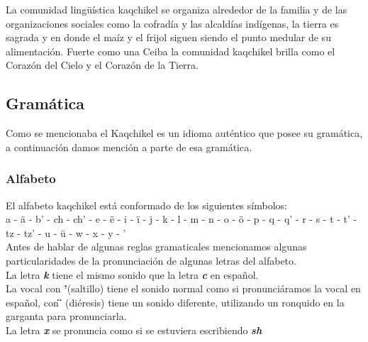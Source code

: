 \documentclass[a4paper,openright,11pt]{article}
\begin{document}
La comunidad lingüística kaqchikel se organiza alrededor de la familia y de las organizaciones sociales como la cofradía y las alcaldías indígenas, la tierra es sagrada y en donde el maíz y el frijol siguen siendo el punto medular de su alimentación. Fuerte como una Ceiba la comunidad kaqchikel brilla como el Corazón del Cielo y el Corazón de la Tierra.\\ 

\newpage
\subsection{Gramática}
Como se mencionaba el Kaqchikel es un idioma auténtico que posee su gramática, a continuación damos mención a parte de esa gramática.\\

\subsubsection{Alfabeto}
El alfabeto kaqchikel está conformado de los siguientes símbolos:\\
a - ä - b' - ch - ch' - e - ë - i - ï - j - k - l - m - n - o - ö - p - q - q' - r - s - t - t' - tz - tz' - u - ü - w - x - y - '\\

Antes de hablar de algunas reglas gramaticales mencionamos algunas particularidades de la pronunciación de algunas letras del alfabeto.\\ 

La letra \textbf{\textit{k}} tiene el mismo sonido que la letra \textit{\textbf{c}} en español.\\
La vocal con \textbf{'}(saltillo) tiene el sonido normal como si pronunciáramos la vocal en español, con \textbf{\"} (diéresis) tiene un sonido diferente, utilizando un ronquido en la garganta para pronunciarla.\\
La letra \textbf{\textit{x}} se pronuncia como si se estuviera escribiendo \textbf{\textit{sh}}
\end{document}
